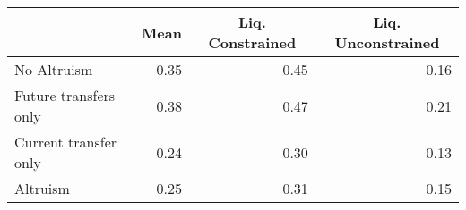 \begin{tabular}{lrrr}
\toprule
  & \multicolumn{1}{c}{Mean} & \multicolumn{1}{c}{Liq. Constrained} & \multicolumn{1}{c}{Liq. Unconstrained} \\
\midrule
No Altruism & 0.35 & 0.45 & 0.16\\
\;Future transfers only & 0.38 & 0.47 & 0.21\\
\;Current transfer only & 0.24 & 0.30 & 0.13\\
Altruism & 0.25 & 0.31 & 0.15\\
\bottomrule
\end{tabular}
